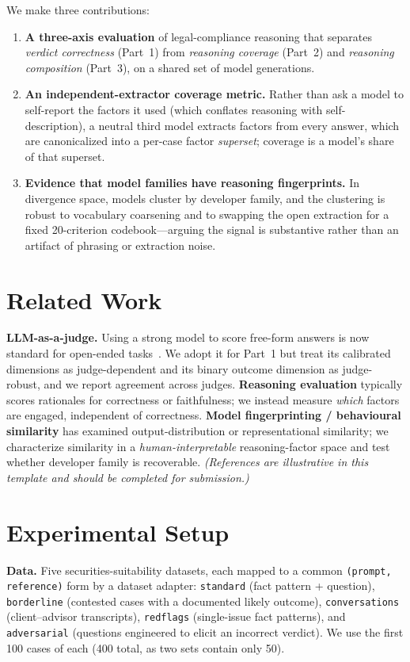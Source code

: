 \documentclass{article}
\begin{document}
We make three contributions:
\begin{enumerate}
\item \textbf{A three-axis evaluation} of legal-compliance reasoning that separates
  \emph{verdict correctness} (Part~1) from \emph{reasoning coverage} (Part~2) and
  \emph{reasoning composition} (Part~3), on a shared set of model generations.
\item \textbf{An independent-extractor coverage metric.} Rather than ask a model to
  self-report the factors it used (which conflates reasoning with self-description), a neutral
  third model extracts factors from every answer, which are canonicalized into a per-case
  factor \emph{superset}; coverage is a model's share of that superset.
\item \textbf{Evidence that model families have reasoning fingerprints.} In divergence space,
  models cluster by developer family, and the clustering is robust to vocabulary coarsening and
  to swapping the open extraction for a fixed 20-criterion codebook---arguing the signal is
  substantive rather than an artifact of phrasing or extraction noise.
\end{enumerate}

\section{Related Work}

\textbf{LLM-as-a-judge.} Using a strong model to score free-form answers is now standard for
open-ended tasks~\citep{zheng2023judging}. We adopt it for Part~1 but treat its calibrated
dimensions as judge-dependent and its binary outcome dimension as judge-robust, and we report
agreement across judges. \textbf{Reasoning evaluation} typically scores rationales for
correctness or faithfulness; we instead measure \emph{which} factors are engaged, independent
of correctness. \textbf{Model fingerprinting / behavioural similarity} has examined
output-distribution or representational similarity; we characterize similarity in a
\emph{human-interpretable} reasoning-factor space and test whether developer family is
recoverable. \emph{(References are illustrative in this template and should be completed for
submission.)}

\section{Experimental Setup}

\textbf{Data.} Five securities-suitability datasets, each mapped to a common
\texttt{(prompt, reference)} form by a dataset adapter: \texttt{standard} (fact pattern +
question), \texttt{borderline} (contested cases with a documented likely outcome),
\texttt{conversations} (client--advisor transcripts), \texttt{redflags} (single-issue fact
patterns), and \texttt{adversarial} (questions engineered to elicit an incorrect verdict). We
use the first 100 cases of each (400 total, as two sets contain only 50).
\end{document}
